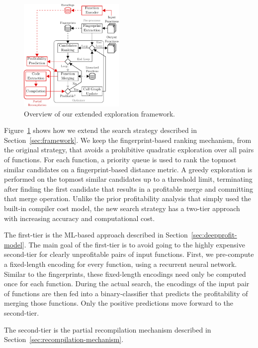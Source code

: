 \begin{figure}[h]
  \centering
  \includegraphics[width=0.45\textwidth]{src/deeplearning/figs/func-merge-opt-new-arch.pdf}
  \caption{Overview of our extended exploration framework.}
  \label{fig:func-merge-opt-new-arch}
\end{figure}

Figure~\ref{fig:func-merge-opt-new-arch} shows how we extend the search strategy described in Section~\ref{sec:framework}.
We keep the fingerprint-based ranking mechanism, from the original strategy, that avoids a prohibitive quadratic exploration over all pairs of functions.
For each function, a priority queue is used to rank the topmost similar candidates on a fingerprint-based distance metric.
A greedy exploration is performed on the topmost similar candidates up to a threshold limit, terminating after finding the first candidate that results in a profitable merge and committing that merge operation.
Unlike the prior profitability analysis that simply used the built-in compiler cost model, the new search strategy has a two-tier approach with increasing accuracy and computational cost.

The first-tier is the ML-based approach described in Section~\ref{sec:deepprofit-model}.
The main goal of the first-tier is to avoid going to the highly expensive second-tier for clearly unprofitable pairs of input functions. 
First, we pre-compute a fixed-length encoding for every function, using a recurrent neural network.
Similar to the fingerprints, these fixed-length encodings need only be computed once for each function.
During the actual search, the encodings of the input pair of functions are then fed into a binary-classifier that predicts the profitability of merging those functions.
Only the positive predictions move forward to the second-tier.

The second-tier is the partial recompilation mechanism described in Section~\ref{sec:recompilation-mechanism}.















